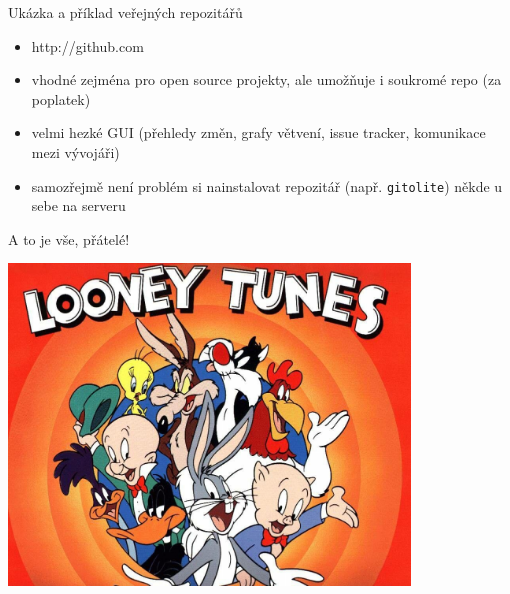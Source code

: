 \documentclass{beamer}
\begin{document}
\begin{frame}{Ukázka a příklad veřejných repozitářů}
  \begin{itemize}
    \item http://github.com
    \item vhodné zejména pro open source projekty, ale umožňuje i soukromé repo (za poplatek)
    \item velmi hezké GUI (přehledy změn, grafy větvení, issue tracker, komunikace mezi vývojáři)
    \item samozřejmě není problém si nainstalovat repozitář (např. \texttt{gitolite}) někde u sebe na serveru
  \end{itemize}
\end{frame}



\begin{frame}{A to je vše, přátelé!}
  \begin{center}
    \includegraphics[width=0.8\textwidth]{looney_tunes}
  \end{center}
\end{frame}
\end{document}
